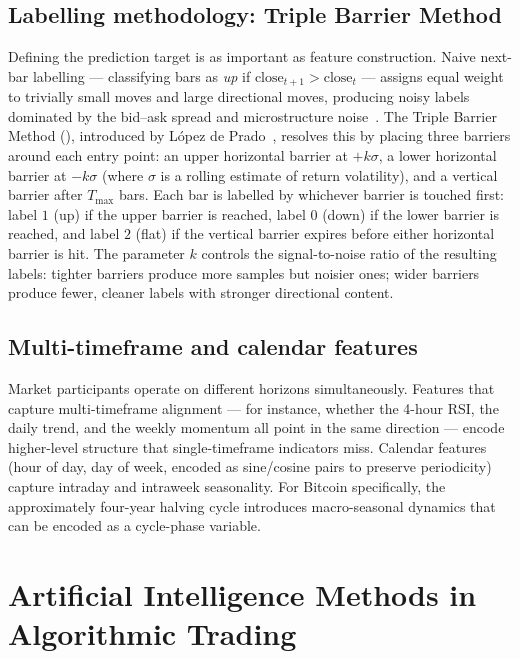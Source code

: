 \subsection{Labelling methodology: Triple Barrier Method}
Defining the prediction target is as important as feature construction. Naive next-bar labelling — classifying bars as \textit{up} if $\text{close}_{t+1} > \text{close}_t$ — assigns equal weight to trivially small moves and large directional moves, producing noisy labels dominated by the bid--ask spread and microstructure noise~\cite{lopezdeprado2018advances}. The Triple Barrier Method (), introduced by L{\'o}pez de Prado~\cite{lopezdeprado2018advances}, resolves this by placing three barriers around each entry point: an upper horizontal barrier at $+k\sigma$, a lower horizontal barrier at $-k\sigma$ (where $\sigma$ is a rolling estimate of return volatility), and a vertical barrier after $T_{\max}$ bars. Each bar is labelled by whichever barrier is touched first: label $1$ (up) if the upper barrier is reached, label $0$ (down) if the lower barrier is reached, and label $2$ (flat) if the vertical barrier expires before either horizontal barrier is hit. The parameter $k$ controls the signal-to-noise ratio of the resulting labels: tighter barriers produce more samples but noisier ones; wider barriers produce fewer, cleaner labels with stronger directional content.

\subsection{Multi-timeframe and calendar features}
Market participants operate on different horizons simultaneously. Features that capture multi-timeframe alignment — for instance, whether the 4-hour RSI, the daily trend, and the weekly momentum all point in the same direction — encode higher-level structure that single-timeframe indicators miss. Calendar features (hour of day, day of week, encoded as sine/cosine pairs to preserve periodicity) capture intraday and intraweek seasonality. For Bitcoin specifically, the approximately four-year halving cycle introduces macro-seasonal dynamics that can be encoded as a cycle-phase variable.

\section{Artificial Intelligence Methods in Algorithmic Trading}

